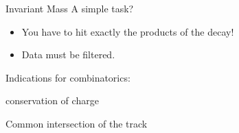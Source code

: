  \begin{frame}{Invariant Mass}
     A simple task?\\ \vspace{0.5cm} %
     \begin{itemize}
         \item [\ding{43}] You have to hit exactly the products of the decay! \\ 
         \item [\ding{43}] Data must be filtered. 
               \end{itemize}\vspace{0.5cm} %
           Indications for combinatorics: 
           
          \begin{itemise}
         \item [\ding{202}]conservation of charge
         \item [\ding{203}]Common intersection of the track
                    \end{itemise}
\end{frame}
